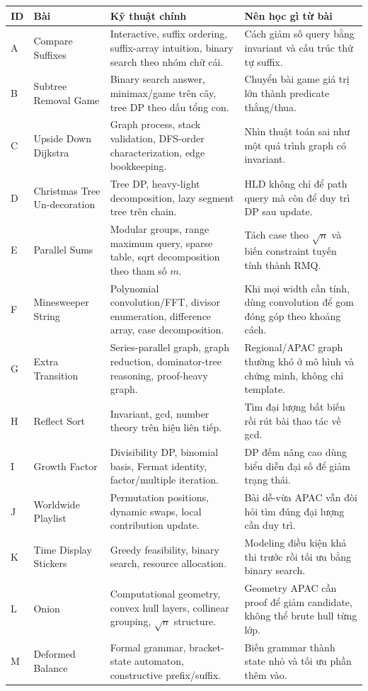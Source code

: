 \documentclass[11pt,a4paper]{article}
\begin{document}
\begin{longtable}{p{0.8cm}p{4.1cm}p{5.0cm}p{4.4cm}}
\toprule
\textbf{ID} & \textbf{Bài} & \textbf{Kỹ thuật chính} & \textbf{Nên học gì từ bài}\\
\midrule
A & Compare Suffixes & Interactive, suffix ordering, suffix-array intuition, binary search theo nhóm chữ cái. & Cách giảm số query bằng invariant và cấu trúc thứ tự suffix.\\
\addlinespace
B & Subtree Removal Game & Binary search answer, minimax/game trên cây, tree DP theo dấu tổng con. & Chuyển bài game giá trị lớn thành predicate thắng/thua.\\
\addlinespace
C & Upside Down Dijkstra & Graph process, stack validation, DFS-order characterization, edge bookkeeping. & Nhìn thuật toán sai như một quá trình graph có invariant.\\
\addlinespace
D & Christmas Tree Un-decoration & Tree DP, heavy-light decomposition, lazy segment tree trên chain. & HLD không chỉ để path query mà còn để duy trì DP sau update.\\
\addlinespace
E & Parallel Sums & Modular groups, range maximum query, sparse table, sqrt decomposition theo tham số $m$. & Tách case theo $\sqrt n$ và biến constraint tuyến tính thành RMQ.\\
\addlinespace
F & Minesweeper String & Polynomial convolution/FFT, divisor enumeration, difference array, case decomposition. & Khi mọi width cần tính, dùng convolution để gom đóng góp theo khoảng cách.\\
\addlinespace
G & Extra Transition & Series-parallel graph, graph reduction, dominator-tree reasoning, proof-heavy graph. & Regional/APAC graph thường khó ở mô hình và chứng minh, không chỉ template.\\
\addlinespace
H & Reflect Sort & Invariant, gcd, number theory trên hiệu liên tiếp. & Tìm đại lượng bất biến rồi rút bài thao tác về gcd.\\
\addlinespace
I & Growth Factor & Divisibility DP, binomial basis, Fermat identity, factor/multiple iteration. & DP đếm nâng cao dùng biểu diễn đại số để giảm trạng thái.\\
\addlinespace
J & Worldwide Playlist & Permutation positions, dynamic swaps, local contribution update. & Bài dễ-vừa APAC vẫn đòi hỏi tìm đúng đại lượng cần duy trì.\\
\addlinespace
K & Time Display Stickers & Greedy feasibility, binary search, resource allocation. & Modeling điều kiện khả thi trước rồi tối ưu bằng binary search.\\
\addlinespace
L & Onion & Computational geometry, convex hull layers, collinear grouping, $\sqrt n$ structure. & Geometry APAC cần proof để giảm candidate, không thể brute hull từng lớp.\\
\addlinespace
M & Deformed Balance & Formal grammar, bracket-state automaton, constructive prefix/suffix. & Biến grammar thành state nhỏ và tối ưu phần thêm vào.\\
\bottomrule
\end{longtable}
\end{document}
